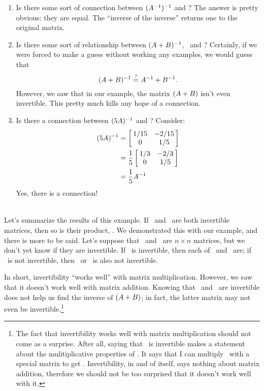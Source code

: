 {\begin{enumerate}
\item		Is there some sort of connection between $(\ttai)^{-1}$ and \tta? The answer is pretty obvious: they are equal. The ``inverse of the inverse'' returns one to the original matrix.


\item		Is there some sort of relationship between $(\tta+\ttb)^{-1}$, \ttai\ and \ttbi? Certainly, if we were forced to make a guess without working any examples, we would guess that $$(\tta+\ttb)^{-1} \overset{\text{?}}{=} \ttai+\ttbi.$$ However, we saw that in our example, the matrix $(\tta+\ttb)$ isn't even invertible. This pretty much kills any hope of a connection.

\item		Is there a connection between $(5\tta)^{-1}$ and \ttai? Consider:
	\begin{align*} (5\tta)^{-1} &= \bmx{cc} 1/15 & -2/15\\ 0 & 1/5\emx \\
				&= \frac{1}{5} \bmx{cc} 1/3 & -2/3\\0&1/5\emx \\
				&= \frac 15 \ttai
	\end{align*}
\enlargethispage{2\baselineskip}	
	Yes, there is a connection!
\end{enumerate}
} \\ %

Let's summarize the results of this example. If \tta\ and \ttb\ are both invertible matrices, then so is their product, \tta\ttb. We demonstrated this with our example, and there is more to be said. Let's suppose that \tta\ and \ttb\ are $n\times n$ matrices, but we don't yet know if they are invertible. If \tta\ttb\ is invertible, then each of \tta\ and \ttb\ are; if \tta\ttb\ is not invertible, then \tta\ or \ttb\ is also not invertible.

In short, invertibility ``works well'' with matrix multiplication. However, we saw that it doesn't work well with matrix addition. Knowing that \tta\ and \ttb\ are invertible does not help us find the inverse of $(\tta+\ttb)$; in fact, the latter matrix may not even be invertible.\footnote{The fact that invertibility works well with matrix multiplication should not come as a surprise. After all, saying that \tta\ is invertible makes a statement about the mulitiplicative properties of \tta. It says that I can multiply \tta\ with a special matrix to get \tti. Invertibility, in and of itself, says nothing about matrix addition, therefore we should not be too surprised that it doesn't work well with it.}

